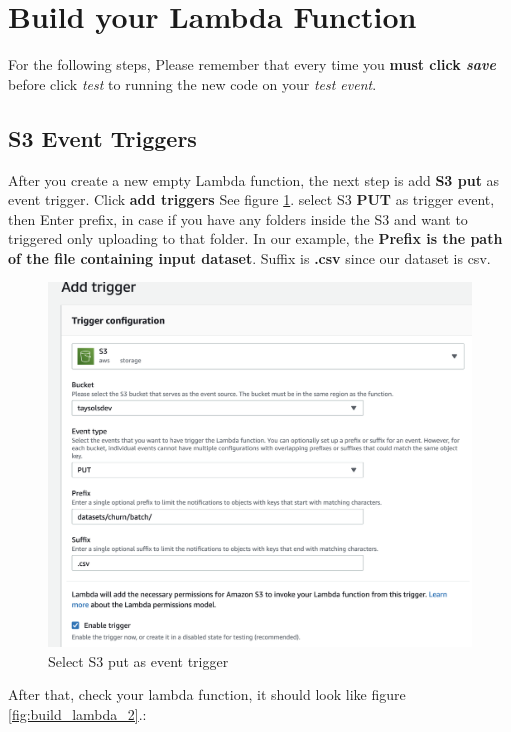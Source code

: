 \documentclass[12pt]{article}
\begin{document}
\newpage
\section{Build your Lambda Function}

For the following steps, Please remember that every time you \textbf{must click \textit{save} } before click \textit{test}  to running the new code on your \textit{test event}.

\subsection{S3 Event Triggers}
After you create a new empty Lambda function, the next step is add \textbf{S3 put} as event trigger. Click \textbf{add triggers}
See figure \ref{fig:build_lambda_1}. select S3 \textbf{PUT} as trigger event, then Enter prefix, in case if you have any folders inside the S3 and want to triggered only uploading to that folder. In our example, the \textbf{Prefix is the path of the file containing input dataset}. Suffix is \textbf{.csv} since our dataset is csv. 
\begin{figure}[H]
\centering
\begin{minipage}{1\textwidth}
  \centering
  \includegraphics[width=1\linewidth]{build_lambda_1.png}
   \caption{Select S3 put as event trigger}
   \label{fig:build_lambda_1}
\end{minipage}%
\end{figure}
After that, check your lambda function, it should look like figure \ref{fig:build_lambda_2}.:
\end{document}
